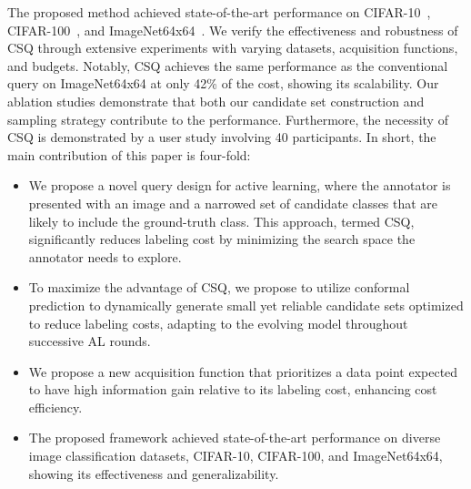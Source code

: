 The proposed method achieved state-of-the-art performance on CIFAR-10~\citep{krizhevsky2009learning}, CIFAR-100~\citep{krizhevsky2009learning}, and ImageNet64x64~\citep{chrabaszcz2017downsampled}.
We verify the effectiveness and robustness of CSQ through extensive experiments with varying datasets, acquisition functions, and budgets.
Notably, CSQ achieves the same performance as the conventional query on ImageNet64x64 at only 42\% of the cost, showing its scalability.
Our ablation studies demonstrate that both our candidate set construction and sampling strategy contribute to the performance.
Furthermore, the necessity of CSQ is demonstrated by a user study involving 40 participants.
In short, the main contribution of this paper is four-fold:

\begin{itemize}[leftmargin=6mm] 
    \item We propose a novel query design for active learning, where the annotator is presented with an image and a narrowed set of candidate classes that are likely to include the ground-truth class.
    This approach, termed CSQ, significantly reduces labeling cost by minimizing the search space the annotator needs to explore.

    \item To maximize the advantage of CSQ, we propose to utilize conformal prediction to dynamically generate small yet reliable candidate sets optimized to reduce labeling costs, adapting to the evolving model throughout successive AL rounds.
    
    \item We propose a new acquisition function that prioritizes a data point expected to have high information gain relative to its labeling cost, enhancing cost efficiency.

    \item The proposed framework achieved state-of-the-art performance on diverse image classification datasets, CIFAR-10, CIFAR-100, and ImageNet64x64, showing its effectiveness and generalizability.
\end{itemize}
